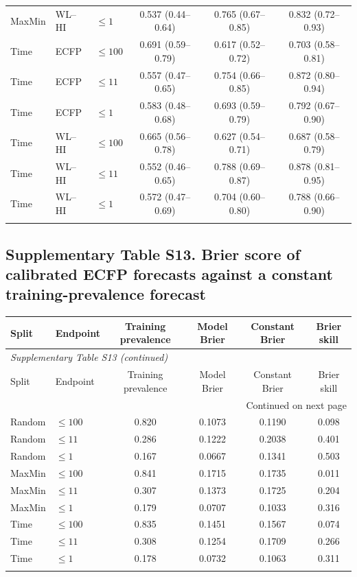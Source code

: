 \begin{longtable}{lllccc}
MaxMin & WL--HI & $\leq1$ & 0.537 (0.44--0.64) & 0.765 (0.67--0.85) & 0.832 (0.72--0.93) \\
\addlinespace
Time & ECFP & $\leq100$ & 0.691 (0.59--0.79) & 0.617 (0.52--0.72) & 0.703 (0.58--0.81) \\
Time & ECFP & $\leq11$ & 0.557 (0.47--0.65) & 0.754 (0.66--0.85) & 0.872 (0.80--0.94) \\
Time & ECFP & $\leq1$ & 0.583 (0.48--0.68) & 0.693 (0.59--0.79) & 0.792 (0.67--0.90) \\
\addlinespace
Time & WL--HI & $\leq100$ & 0.665 (0.56--0.78) & 0.627 (0.54--0.71) & 0.687 (0.58--0.79) \\
Time & WL--HI & $\leq11$ & 0.552 (0.46--0.65) & 0.788 (0.69--0.87) & 0.878 (0.81--0.95) \\
Time & WL--HI & $\leq1$ & 0.572 (0.47--0.69) & 0.704 (0.60--0.80) & 0.788 (0.66--0.90) \\
\addlinespace
\end{longtable}

\subsection*{Supplementary Table S13. Brier score of calibrated ECFP forecasts against a constant training-prevalence forecast}
\begin{longtable}{llcccc}

\toprule Split & Endpoint & Training prevalence & Model Brier & Constant Brier & Brier skill \\ \midrule\endfirsthead
\multicolumn{6}{l}{\textit{Supplementary Table S13 (continued)}} \\
\toprule Split & Endpoint & Training prevalence & Model Brier & Constant Brier & Brier skill \\ \midrule\endhead
\midrule\multicolumn{6}{r}{Continued on next page}\\\endfoot
\bottomrule\endlastfoot
Random & $\leq100$ & 0.820 & 0.1073 & 0.1190 & 0.098 \\
Random & $\leq11$ & 0.286 & 0.1222 & 0.2038 & 0.401 \\
Random & $\leq1$ & 0.167 & 0.0667 & 0.1341 & 0.503 \\
\addlinespace
MaxMin & $\leq100$ & 0.841 & 0.1715 & 0.1735 & 0.011 \\
MaxMin & $\leq11$ & 0.307 & 0.1373 & 0.1725 & 0.204 \\
MaxMin & $\leq1$ & 0.179 & 0.0707 & 0.1033 & 0.316 \\
\addlinespace
Time & $\leq100$ & 0.835 & 0.1451 & 0.1567 & 0.074 \\
Time & $\leq11$ & 0.308 & 0.1254 & 0.1709 & 0.266 \\
Time & $\leq1$ & 0.178 & 0.0732 & 0.1063 & 0.311 \\
\addlinespace
\end{longtable}


